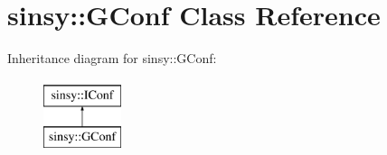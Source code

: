 \hypertarget{classsinsy_1_1GConf}{\section{sinsy\-:\-:\-G\-Conf \-Class \-Reference}
\label{classsinsy_1_1GConf}
}
\-Inheritance diagram for sinsy\-:\-:\-G\-Conf\-:\begin{figure}[H]
\begin{center}
\leavevmode
\includegraphics[height=2.000000cm]{classsinsy_1_1GConf}
\end{center}
\end{figure}
